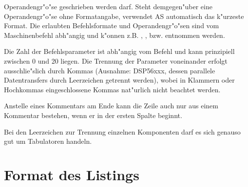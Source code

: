 \documentclass[12pt,a4paper,twoside]{report}
\begin{document}
Operandengr"o"se geschrieben werden darf.  Steht demgegen"uber eine
Operandengr"o"se ohne Formatangabe, verwendet AS automatisch das
k"urzeste Format.  Die erlaubten Befehlsformate und Operandengr"o"sen
sind vom Maschinenbefehl abh"angig und k"onnen z.B. \cite{Tosh9000},
\cite{HitH8_5}, \cite{MitM16} bzw. \cite{MitM16C} entnommen werden.
\par
Die Zahl der Befehlsparameter ist abh"angig vom Befehl und kann
prinzipiell zwischen 0 und 20 liegen.  Die Trennung der Parameter
voneinander erfolgt ausschlie"slich durch Kommas (Ausnahme: DSP56xxx,
dessen parallele Datentransfers durch Leerzeichen getrennt werden),
wobei in Klammern oder Hochkommas eingeschlossene Kommas nat"urlich
nicht beachtet werden.
\par
Anstelle eines Kommentars am Ende kann die Zeile auch nur aus einem
Kommentar bestehen, wenn er in der ersten Spalte beginnt.
\par
Bei den Leerzeichen zur Trennung einzelnen Komponenten darf es sich
genauso gut um Tabulatoren handeln.


\section{Format des Listings}
\end{document}
